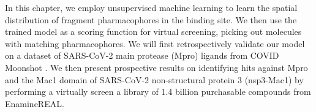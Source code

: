 In this chapter, we employ unsupervised machine learning to learn the spatial distribution of fragment pharmacophores in the binding site. We then use the trained model as a scoring function for virtual screening, picking out molecules with matching pharmacophores. We will first retrospectively validate our model on a dataset of SARS-CoV-2 main protease (Mpro) ligands from COVID Moonshot \cite{Moonshot2022}. We then present prospective results on identifying hits against Mpro and the Mac1 domain of SARS-CoV-2 non-structural protein 3 (nsp3-Mac1) by performing a virtually screen a library of 1.4 billion purchasable compounds from EnamineREAL.


